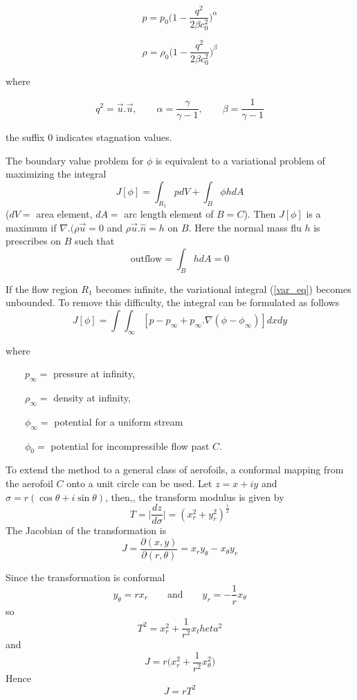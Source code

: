 \documentclass[a4paper]{article}
\begin{document}
	$$p=p_0 \Biggl(
	1-\frac{q^2}{2\beta c^2_0}
	\Biggr)^\alpha$$

	$$\rho=\rho_0 \Biggl(
	1-\frac{q^2}{2\beta c^2_0}
	\Biggr)^\beta$$	
	
	where
	
	$$q^2 = \vec{u}.\vec{u}, \qquad \alpha=\frac{\gamma}{\gamma-1},
	\qquad \beta=\frac{1}{\gamma-1}$$
	
	the suffix $0$ indicates stagnation values.
	
	The boundary value problem for $\phi$ is equivalent to a variational problem of maximizing the integral 
	\begin{equation} \label{var_eq}
		 J[\phi] = \int_{R_1} pdV + \int_B\phi h dA
	\end{equation}
	($dV = $ area element, $dA = $ arc length element of $B=C$). Then $J[\phi]$ is a maximum if $\nabla.(\rho \vec{u} = 0$ and
	$\rho\vec{u}.\hat{n} = h$ on $B$. Here the normal mass flu $h$ is prescribes on $B$ such that 
	$$ \text{outflow} = \int_B hdA = 0$$
	
	If the flow region $R_1$ becomes infinite, the variational integral (\ref{var_eq}) becomes unbounded. To remove this difficulty, the integral can be formulated as follows
	\begin{equation} \label{var_eq2}
		J[\phi] = \int\int_\infty [ p-p_\infty+p_\infty.\nabla(\phi-\phi_\infty) ]dxdy
	\end{equation}
	
	where 
	
	$\qquad p_\infty = $ pressure at infinity, 
	
	$\qquad \rho_\infty = $ density at infinity, 
	
	$\qquad \phi_\infty = $ potential for a uniform stream 
	
	$\qquad \phi_0 = $ potential for incompressible flow past $C$.
	
	To extend the method to a general class of aerofoils, a conformal mapping from the aerofoil $C$ onto a unit circle can be used. Let $z=x+iy$ and $\sigma=r(\cos \theta + i \sin \theta)$, then,, the transform modulus is given by	
	$$
	T = \Biggl|\frac{dz}{d\sigma}\Biggr|
	= (x_r^2+y_r^2)^\frac{1}{2}
	$$
	The Jacobian of the transformation is
	$$
	J= \frac{\partial(x,y)}{\partial(r,\theta)}
	= x_r y_\theta - x_\theta y_r
	$$
	
	Since the transformation is conformal
	$$
	y_\theta = rx_r \qquad \text{and} \qquad y_r=-\frac{1}{r}x_\theta
	$$
	so
	$$
	T^2 = x_r^2 + \frac{1}{r^2}x_theta^2
	$$
	and
	$$
	J=r\Biggl(
	x^2_r+\frac{1}{r^2}x^2_\theta
	\Biggr)
	$$
	Hence 
	\begin{equation} \label{J}
		 J=rT^2
	\end{equation}
	
\end{document}
